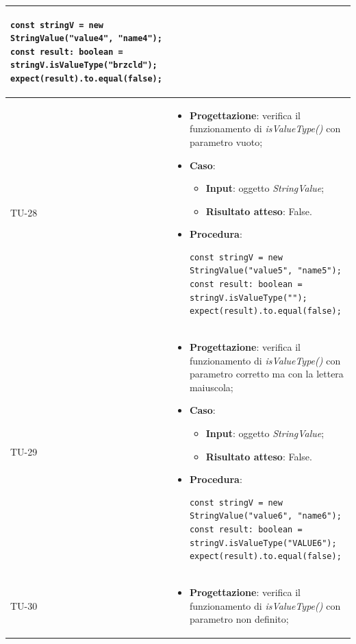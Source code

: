 \begin{longtable}{|C{1.5cm}|C{14.5cm}|}
\begin{itemize}
		\begin{lstlisting}
const stringV = new StringValue("value4", "name4");
const result: boolean = stringV.isValueType("brzcld");
expect(result).to.equal(false);		
		\end{lstlisting}
	\end{itemize}\\
	\hline
	{TU-28} &  
	\begin{itemize}
		\item \textbf{Progettazione}: verifica il funzionamento di \emph{isValueType()} con parametro vuoto;
		\item \textbf{Caso}: 
		\begin{itemize}
			\item \textbf{Input}: oggetto \emph{StringValue};
			\item \textbf{Risultato atteso}: False.
		\end{itemize}
		\item \textbf{Procedura}:
		\begin{lstlisting}
const stringV = new StringValue("value5", "name5");
const result: boolean = stringV.isValueType("");
expect(result).to.equal(false);
		\end{lstlisting}
	\end{itemize}\\
	\hline
	{TU-29} &  
	\begin{itemize}
		\item \textbf{Progettazione}: verifica il funzionamento di \emph{isValueType()} con parametro corretto ma con la lettera maiuscola;
		\item \textbf{Caso}: 
		\begin{itemize}
			\item \textbf{Input}: oggetto \emph{StringValue};
			\item \textbf{Risultato atteso}: False.
		\end{itemize}
		\item \textbf{Procedura}:
		\begin{lstlisting}
const stringV = new StringValue("value6", "name6");
const result: boolean = stringV.isValueType("VALUE6");
expect(result).to.equal(false);
		\end{lstlisting}
	\end{itemize}\\
	\hline
	{TU-30} &  
	\begin{itemize}
		\item \textbf{Progettazione}: verifica il funzionamento di \emph{isValueType()} con parametro non definito;

\end{itemize}
\end{longtable}
